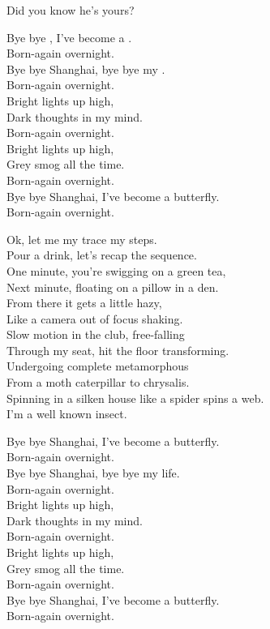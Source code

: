 Did you know he's yours? \\





Bye bye , I've become a . \\
Born-again overnight. \\
Bye bye Shanghai, bye bye my . \\
Born-again overnight. \\
Bright lights up high, \\
Dark thoughts in my mind. \\
Born-again overnight. \\
Bright lights up high, \\
Grey smog all the time. \\
Born-again overnight. \\
Bye bye Shanghai, I've become a butterfly. \\
Born-again overnight. \\


Ok, let me my trace my steps. \\
Pour a drink, let's recap the sequence. \\
One minute, you're swigging on a green tea, \\
Next minute, floating on a pillow in a den. \\
From there it gets a little hazy, \\
Like a camera out of focus shaking. \\
Slow motion in the club, free-falling \\
Through my seat, hit the floor transforming. \\
Undergoing complete metamorphous \\
From a moth caterpillar to chrysalis. \\
Spinning in a silken house like a spider spins a web. \\
I'm a well known insect. \\


Bye bye Shanghai, I've become a butterfly. \\
Born-again overnight. \\
Bye bye Shanghai, bye bye my life. \\
Born-again overnight. \\
Bright lights up high, \\
Dark thoughts in my mind. \\
Born-again overnight. \\
Bright lights up high, \\
Grey smog all the time. \\
Born-again overnight. \\
Bye bye Shanghai, I've become a butterfly. \\
Born-again overnight. \\

